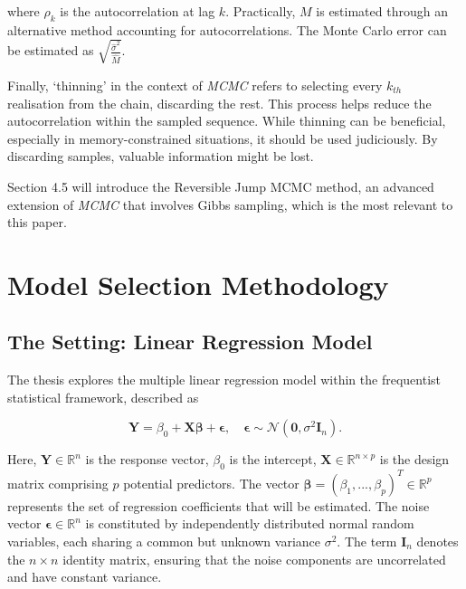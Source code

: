 \documentclass[
  11pt,
]{article}
\begin{document}
where \(\rho_k\) is the autocorrelation at lag \(k\). Practically, \(M\)
is estimated through an alternative method accounting for
autocorrelations. The Monte Carlo error can be estimated as
\(\sqrt{\frac{\hat{\sigma}^2}{\hat{M}}}\).

Finally, `thinning' in the context of \emph{MCMC} refers to selecting
every \(k_{th}\) realisation from the chain, discarding the rest. This
process helps reduce the autocorrelation within the sampled sequence.
While thinning can be beneficial, especially in memory-constrained
situations, it should be used judiciously. By discarding samples,
valuable information might be lost.

Section 4.5 will introduce the Reversible Jump MCMC method, an advanced
extension of \emph{MCMC} that involves Gibbs sampling, which is the most
relevant to this paper.

\newpage

\section{Model Selection Methodology}

\subsection{The Setting: Linear Regression Model}

The thesis explores the multiple linear regression model within the
frequentist statistical framework, described as

\begin{equation}
\mathbf{Y} = \beta_0 + \mathbf{X}\boldsymbol{\beta} + \boldsymbol{\epsilon}, \quad \boldsymbol{\epsilon} \sim \mathcal{N}(\mathbf{0}, \sigma^2\mathbf{I}_n).
\end{equation}

Here, \(\mathbf{Y} \in \mathbb{R}^n\) is the response vector,
\(\beta_0\) is the intercept, \(\mathbf{X} \in \mathbb{R}^{n \times p}\)
is the design matrix comprising \(p\) potential predictors. The vector
\(\boldsymbol{\beta} = (\beta_1, ..., \beta_{p})^T \in \mathbb{R}^{p}\)
represents the set of regression coefficients that will be estimated.
The noise vector \(\boldsymbol{\epsilon} \in \mathbb{R}^n\) is
constituted by independently distributed normal random variables, each
sharing a common but unknown variance \(\sigma^2\). The term
\(\mathbf{I}_n\) denotes the \(n \times n\) identity matrix, ensuring
that the noise components are uncorrelated and have constant variance.
\end{document}
